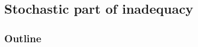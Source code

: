 \documentclass[10pt,xcolor=dvipsnames,compress]{beamer}
\begin{document}
\subsection{Stochastic part of inadequacy}
\begin{frame}
\frametitle{Outline}
\vfill

\vspace{0.7in}
\vspace{0.7in}

\vfill
\end{frame}
\end{document}
